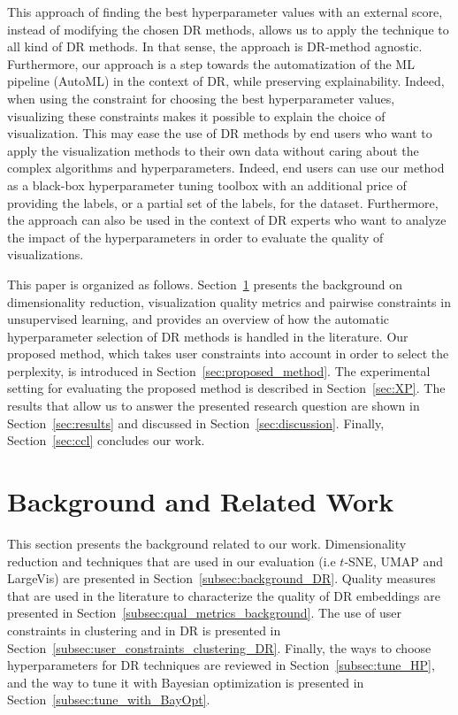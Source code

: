 This approach of finding the best hyperparameter values with an external score, instead of modifying the chosen DR methods, allows us to apply the technique to all kind of DR methods. In that sense, the approach is DR-method agnostic. Furthermore, our approach is a step towards the automatization of the ML pipeline (AutoML) in the context of DR, while preserving explainability. Indeed, when using the constraint for choosing the best hyperparameter values, visualizing these constraints makes it possible to explain the choice of visualization. This may ease the use of DR methods by end users who want to apply the visualization methods to their own data without caring about the complex algorithms and hyperparameters. Indeed, end users can use our method as a black-box hyperparameter tuning toolbox with an additional price of providing the labels, or a partial set of the labels, for the dataset. Furthermore, the approach can also be used in the context of DR experts who want to analyze the impact of the hyperparameters in order to evaluate the quality of visualizations.

This paper is organized as follows. Section~\ref{sec:background} presents the background on dimensionality reduction, visualization quality metrics and pairwise constraints in unsupervised learning, and provides an overview of how the automatic hyperparameter selection of DR methods is handled in the literature. Our proposed method, which takes user constraints into account in order to select the perplexity, is introduced in Section~\ref{sec:proposed_method}. The experimental setting for evaluating the proposed method is described in Section~\ref{sec:XP}. The results that allow us to answer the presented research question are shown in Section~\ref{sec:results} and discussed in Section~\ref{sec:discussion}. Finally, Section~\ref{sec:ccl} concludes our work.

\section{Background and Related Work}\label{sec:background}

This section presents the background related to our work. Dimensionality reduction and techniques that are used in our evaluation (i.e $t$-SNE, UMAP and LargeVis) are presented in Section~\ref{subsec:background_DR}. Quality measures that are used in the literature to characterize the quality of DR embeddings are presented in Section~\ref{subsec:qual_metrics_background}. The use of user constraints in clustering and in DR is presented in Section~\ref{subsec:user_constraints_clustering_DR}. Finally, the ways to choose hyperparameters for DR techniques are reviewed in Section~\ref{subsec:tune_HP}, and the way to tune it with Bayesian optimization is presented in Section~\ref{subsec:tune_with_BayOpt}.

